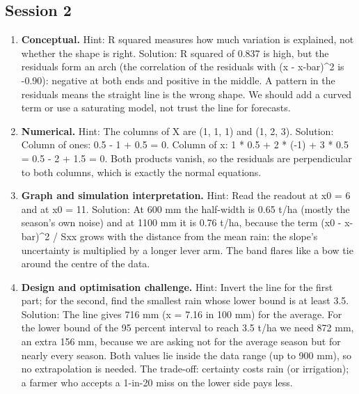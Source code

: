 \documentclass[11pt,a4paper]{article}
\begin{document}
\subsection*{Session 2}
\begin{enumerate}[nosep]
\item \textbf{Conceptual.} Hint: R squared measures how much variation is explained, not whether the shape is right. Solution: R squared of 0.837 is high, but the residuals form an arch (the correlation of the residuals with (x - x-bar)\textasciicircum{}2 is -0.90): negative at both ends and positive in the middle. A pattern in the residuals means the straight line is the wrong shape. We should add a curved term or use a saturating model, not trust the line for forecasts.
\item \textbf{Numerical.} Hint: The columns of X are (1, 1, 1) and (1, 2, 3). Solution: Column of ones: 0.5 - 1 + 0.5 = 0. Column of x: 1 * 0.5 + 2 * (-1) + 3 * 0.5 = 0.5 - 2 + 1.5 = 0. Both products vanish, so the residuals are perpendicular to both columns, which is exactly the normal equations.
\item \textbf{Graph and simulation interpretation.} Hint: Read the readout at x0 = 6 and at x0 = 11. Solution: At 600 mm the half-width is 0.65 t/ha (mostly the season's own noise) and at 1100 mm it is 0.76 t/ha, because the term (x0 - x-bar)\textasciicircum{}2 / Sxx grows with the distance from the mean rain: the slope's uncertainty is multiplied by a longer lever arm. The band flares like a bow tie around the centre of the data.
\item \textbf{Design and optimisation challenge.} Hint: Invert the line for the first part; for the second, find the smallest rain whose lower bound is at least 3.5. Solution: The line gives 716 mm (x = 7.16 in 100 mm) for the average. For the lower bound of the 95 percent interval to reach 3.5 t/ha we need 872 mm, an extra 156 mm, because we are asking not for the average season but for nearly every season. Both values lie inside the data range (up to 900 mm), so no extrapolation is needed. The trade-off: certainty costs rain (or irrigation); a farmer who accepts a 1-in-20 miss on the lower side pays less.
\end{enumerate}
\end{document}
